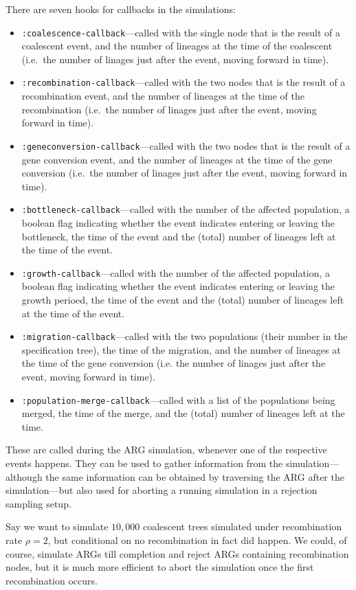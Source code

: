 \documentclass{manual}
\begin{document}
\begin{empfile}
There are seven hooks for callbacks in the simulations:
\begin{itemize}
\item \texttt{:coalescence-callback}---called with the single node
  that is the result of a coalescent event, and the number of lineages
  at the time of the coalescent (i.e.\ the number of linages just after
  the event, moving forward in time).
\item \texttt{:recombination-callback}---called with the two nodes
  that is the result of a recombination event, and the number of
  lineages at the time of the recombination (i.e.\ the number of
  linages just after the event, moving forward in time).
\item \texttt{:geneconversion-callback}---called with the two nodes
  that is the result of a gene conversion event, and the number of
  lineages at the time of the gene conversion (i.e.\ the number of
  linages just after the event, moving forward in time).
\item \texttt{:bottleneck-callback}---called with the number of the
  affected population, a boolean flag indicating whether the event
  indicates entering or leaving the bottleneck, the time of the event
  and the (total) number of lineages left at the time of the event.
\item \texttt{:growth-callback}---called with the number of the
  affected population, a boolean flag indicating whether the event
  indicates entering or leaving the growth perioed, the time of the
  event and the (total) number of lineages left at the time of the
  event.
\item \texttt{:migration-callback}---called with the two populations
  (their number in the specification tree), the time of the migration,
  and the number of lineages at the time of the gene conversion
  (i.e. the number of linages just after the event, moving forward in
  time).
\item \texttt{:population-merge-callback}---called with a list of the
  populations being merged, the time of the merge, and the (total)
  number of lineages left at the time.
\end{itemize}
These are called during the ARG simulation, whenever one of the
respective events happens.  They can be used to gather information
from the simulation---although the same information can be obtained by
traversing the ARG after the simulation---but also used for aborting a
running simulation in a rejection sampling setup.

Say we want to simulate $10,000$ coalescent trees simulated under
recombination rate $\rho=2$, but conditional on no recombination in
fact did happen.  We could, of course, simulate ARGs till completion
and reject ARGs containing recombination nodes, but it is much more
efficient to abort the simulation once the first recombination occurs.


\end{empfile}
\end{document}
